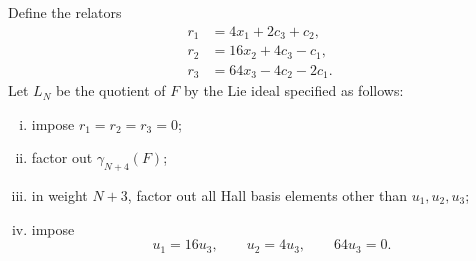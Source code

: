 \documentclass[a4paper,11pt,reqno]{amsart}
\theoremstyle{definition}
\begin{document}
Define the relators
\begin{equation}\label{eq:shifted-relators}
 \begin{aligned}
 r_1&=4x_1+2c_3+c_2,\\
 r_2&=16x_2+4c_3-c_1,\\
 r_3&=64x_3-4c_2-2c_1.
 \end{aligned}
\end{equation}
Let $L_N$ be the quotient of $F$ by the Lie ideal specified as follows:
\begin{enumerate}[(i)]
 \item impose $r_1=r_2=r_3=0$;
 \item factor out $\gamma_{N+4}(F)$;
 \item in weight $N+3$, factor out all Hall basis elements other than
 $u_1,u_2,u_3$;
 \item impose
 \[
                    u_1=16u_3,
                    \qquad u_2=4u_3,
                    \qquad 64u_3=0.
 \]
\end{enumerate}
\end{document}
